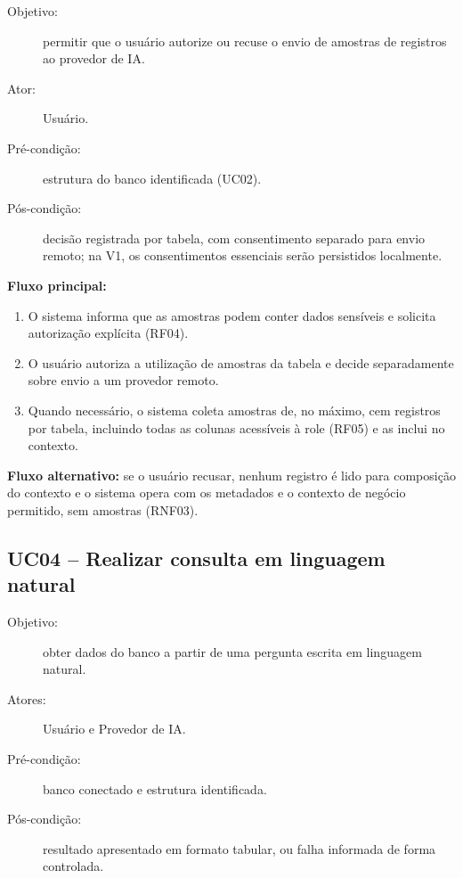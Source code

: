 \begin{apendicesenv}
\begin{description}
    \item[Objetivo:] permitir que o usuário autorize ou recuse o envio de amostras de registros ao provedor de IA.
    \item[Ator:] Usuário.
    \item[Pré-condição:] estrutura do banco identificada (UC02).
    \item[Pós-condição:] decisão registrada por tabela, com consentimento separado para envio remoto; na V1, os consentimentos essenciais serão persistidos localmente.
\end{description}

\textbf{Fluxo principal:}
\begin{enumerate}
    \item O sistema informa que as amostras podem conter dados sensíveis e solicita autorização explícita (RF04).
    \item O usuário autoriza a utilização de amostras da tabela e decide separadamente sobre envio a um provedor remoto.
    \item Quando necessário, o sistema coleta amostras de, no máximo, cem registros por tabela, incluindo todas as colunas acessíveis à role (RF05) e as inclui no contexto.
\end{enumerate}

\textbf{Fluxo alternativo:} se o usuário recusar, nenhum registro é lido para composição do contexto e o sistema opera com os metadados e o contexto de negócio permitido, sem amostras (RNF03).

\subsection{UC04 -- Realizar consulta em linguagem natural}

\begin{description}
    \item[Objetivo:] obter dados do banco a partir de uma pergunta escrita em linguagem natural.
    \item[Atores:] Usuário e Provedor de IA.
    \item[Pré-condição:] banco conectado e estrutura identificada.
    \item[Pós-condição:] resultado apresentado em formato tabular, ou falha informada de forma controlada.
\end{description}


\end{apendicesenv}
